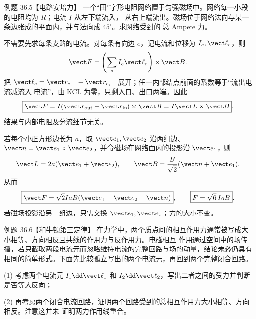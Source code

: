 \Needspace{0.18\textheight}
\begin{origexamplebox}{例题 36.5【电路安培力】}
一个“田”字形电阻网络置于匀强磁场中。网络每一小段的电阻均为 $R$；电流 $I$ 从左下端流入，
从右上端流出。磁场位于网络法向与某一条边张成的平面内，并与法向成 $45^\circ$。求网络受到的
总 Ampere 力。
\end{origexamplebox}

\begin{xesolution}
不需要先求每条支路的电流。对每条有向边 $e$，记电流和位移为 $I_e,\vect\ell_e$，则
\[
  \vect F=\left(\sum_e I_e\vect\ell_e\right)\times\vect B.
\]
把 $\vect\ell_e=\vect r_{e,+}-\vect r_{e,-}$ 展开；任一内部结点前面的系数等于“流出电流减流入
电流”，由 KCL 为零，只剩入口、出口两端。因此
\begin{equation}
  \boxed{\vect F=I(\vect r_{\rm out}-\vect r_{\rm in})\times\vect B
  =I\vect L\times\vect B}.
\end{equation}
结果与内部电阻及分流细节无关。

若每个小正方形边长为 $a$，取 $\vect e_1,\vect e_2$ 沿两组边、
$\vect n=\vect e_1\times\vect e_2$，并令磁场在网络面内的投影沿 $\vect e_1$，则
\[
  \vect L=2a(\vect e_1+\vect e_2),
  \qquad
  \vect B=\frac{B}{\sqrt2}(\vect n+\vect e_1).
\]
从而
\begin{equation}
  \boxed{\vect F=\sqrt2IaB(\vect e_1-\vect e_2-\vect n)},
  \qquad
  \boxed{F=\sqrt6\,IaB}.
\end{equation}
若磁场投影沿另一组边，只需交换 $\vect e_1,\vect e_2$；力的大小不变。

\resistorGridForceDiagram
\end{xesolution}

\Needspace{0.18\textheight}
\begin{origexamplebox}{例题 36.6【和牛顿第三定律】}
在力学中，两个质点间的相互作用力通常被写成大小相等、方向相反且共线的作用力与反作用力。电磁相互
作用通过空间中的场传播，若只截取两段电流元而忽略维持电流的完整回路与场的动量，结论未必仍具有
相同的简单形式。下面先比较孤立写出的两个电流元，再回到两个完整闭合回路。

(1) 考虑两个电流元 $I_1\dd\vect\ell_1$ 和 $I_2\dd\vect\ell_2$，写出二者之间的受力并判断
是否等大反向；

(2) 再考虑两个闭合电流回路，证明两个回路受到的总相互作用力大小相等、方向相反。注意这并未
证明两力作用线重合。
\end{origexamplebox}

